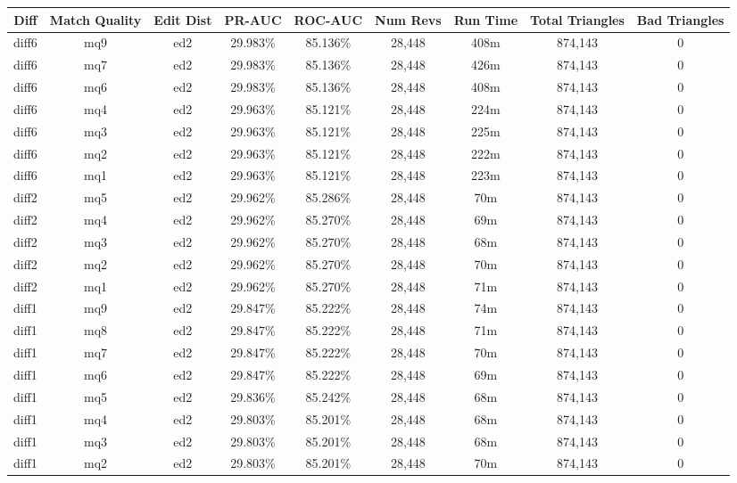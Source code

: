 \begin{sidewaystable}[!ph]
  \begin{center}
    \begin{tabular}{|c|c|c||c|c||c|c|c|c|}
\hline
Diff & Match Quality & Edit Dist
        & PR-AUC & ROC-AUC
        & Num Revs & Run Time
        & Total Triangles & Bad Triangles \\
\hline
\hline
diff6 & mq9 & ed2 & 29.983\% & 85.136\% & 28,448 & 408m & 874,143 & 0 \\
diff6 & mq7 & ed2 & 29.983\% & 85.136\% & 28,448 & 426m & 874,143 & 0 \\
diff6 & mq6 & ed2 & 29.983\% & 85.136\% & 28,448 & 408m & 874,143 & 0 \\
diff6 & mq4 & ed2 & 29.963\% & 85.121\% & 28,448 & 224m & 874,143 & 0 \\
diff6 & mq3 & ed2 & 29.963\% & 85.121\% & 28,448 & 225m & 874,143 & 0 \\
diff6 & mq2 & ed2 & 29.963\% & 85.121\% & 28,448 & 222m & 874,143 & 0 \\
diff6 & mq1 & ed2 & 29.963\% & 85.121\% & 28,448 & 223m & 874,143 & 0 \\
diff2 & mq5 & ed2 & 29.962\% & 85.286\% & 28,448 & 70m & 874,143 & 0 \\
diff2 & mq4 & ed2 & 29.962\% & 85.270\% & 28,448 & 69m & 874,143 & 0 \\
diff2 & mq3 & ed2 & 29.962\% & 85.270\% & 28,448 & 68m & 874,143 & 0 \\
diff2 & mq2 & ed2 & 29.962\% & 85.270\% & 28,448 & 70m & 874,143 & 0 \\
diff2 & mq1 & ed2 & 29.962\% & 85.270\% & 28,448 & 71m & 874,143 & 0 \\
diff1 & mq9 & ed2 & 29.847\% & 85.222\% & 28,448 & 74m & 874,143 & 0 \\
diff1 & mq8 & ed2 & 29.847\% & 85.222\% & 28,448 & 71m & 874,143 & 0 \\
diff1 & mq7 & ed2 & 29.847\% & 85.222\% & 28,448 & 70m & 874,143 & 0 \\
diff1 & mq6 & ed2 & 29.847\% & 85.222\% & 28,448 & 69m & 874,143 & 0 \\
diff1 & mq5 & ed2 & 29.836\% & 85.242\% & 28,448 & 68m & 874,143 & 0 \\
diff1 & mq4 & ed2 & 29.803\% & 85.201\% & 28,448 & 68m & 874,143 & 0 \\
diff1 & mq3 & ed2 & 29.803\% & 85.201\% & 28,448 & 68m & 874,143 & 0 \\
diff1 & mq2 & ed2 & 29.803\% & 85.201\% & 28,448 & 70m & 874,143 & 0 \\

\end{tabular}
\end{center}
\end{sidewaystable}
